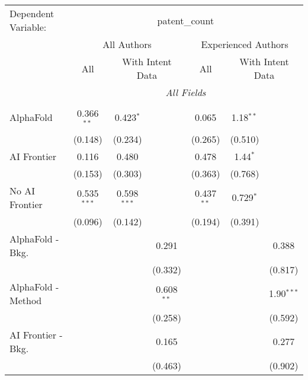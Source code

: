 \begingroup
\centering
\begin{tabular}{lcccccc}
   \tabularnewline \midrule \midrule
   Dependent Variable: & \multicolumn{6}{c}{patent\_count}\\
 & \multicolumn{3}{c}{All Authors} & \multicolumn{3}{c}{Experienced Authors} \\
\cmidrule(lr){2-4} \cmidrule(lr){5-7}
 & \multicolumn{1}{c}{All} & \multicolumn{2}{c}{With Intent Data} & \multicolumn{1}{c}{All} & \multicolumn{2}{c}{With Intent Data} \\
\cmidrule(lr){2-2} \cmidrule(lr){3-4} \cmidrule(lr){5-5} \cmidrule(lr){6-7}
 & \multicolumn{6}{c}{\textit{All Fields}} \\ \\
   AlphaFold               & 0.366$^{**}$  & 0.423$^{*}$   &               & 0.065        & 1.18$^{**}$ &   \\   
                           & (0.148)       & (0.234)       &               & (0.265)      & (0.510)     &   \\   
   AI Frontier             & 0.116         & 0.480         &               & 0.478        & 1.44$^{*}$  &   \\   
                           & (0.153)       & (0.303)       &               & (0.363)      & (0.768)     &   \\   
   No AI Frontier          & 0.535$^{***}$ & 0.598$^{***}$ &               & 0.437$^{**}$ & 0.729$^{*}$ &   \\   
                           & (0.096)       & (0.142)       &               & (0.194)      & (0.391)     &   \\   
   AlphaFold - Bkg.        &               &               & 0.291         &              &             & 0.388\\   
                           &               &               & (0.332)       &              &             & (0.817)\\   
   AlphaFold - Method      &               &               & 0.608$^{**}$  &              &             & 1.90$^{***}$\\   
                           &               &               & (0.258)       &              &             & (0.592)\\   
   AI Frontier - Bkg.      &               &               & 0.165         &              &             & 0.277\\   
                           &               &               & (0.463)       &              &             & (0.902)\\   

\end{tabular}
